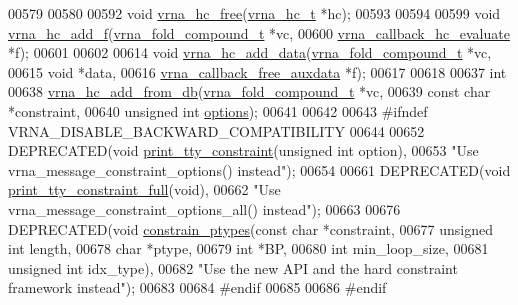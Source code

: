 \begin{DoxyCode}
00579 
00580 
00592 \textcolor{keywordtype}{void} \hyperlink{group__hard__constraints_ga696dcf77887d856c6f21ea266d8b9ca2}{vrna\_hc\_free}(\hyperlink{group__hard__constraints_structvrna__hc__s}{vrna\_hc\_t} *hc);
00593 
00594 
00599 \textcolor{keywordtype}{void} \hyperlink{constraints__hard_8h_af220427ba7ecc8e786a07b7799658f18}{vrna\_hc\_add\_f}(\hyperlink{group__fold__compound_structvrna__fc__s}{vrna\_fold\_compound\_t}       *vc,
00600                    \hyperlink{group__hard__constraints_gae465f1d4a3d8b6592b38ecbb0d9f613d}{vrna\_callback\_hc\_evaluate}  *f);
00601 
00602 
00614 \textcolor{keywordtype}{void} \hyperlink{constraints__hard_8h_a128920e0af52e4196a9d59fa13336c7c}{vrna\_hc\_add\_data}(\hyperlink{group__fold__compound_structvrna__fc__s}{vrna\_fold\_compound\_t}        *vc,
00615                       \textcolor{keywordtype}{void}                        *data,
00616                       \hyperlink{group__fold__compound_ga7806651f51b195013839a218b3bbd5a3}{vrna\_callback\_free\_auxdata}  *f);
00617 
00618 
00637 \textcolor{keywordtype}{int}
00638 \hyperlink{group__hard__constraints_ga5b4de3247b67358080c176b94591a8e6}{vrna\_hc\_add\_from\_db}(\hyperlink{group__fold__compound_structvrna__fc__s}{vrna\_fold\_compound\_t}  *vc,
00639                     \textcolor{keyword}{const} \textcolor{keywordtype}{char}            *constraint,
00640                     \textcolor{keywordtype}{unsigned} \textcolor{keywordtype}{int}          \hyperlink{group__hard__constraints_a468414760f373f7dc0eb1fd47cf708d0}{options});
00641 
00642 
00643 \textcolor{preprocessor}{#ifndef VRNA\_DISABLE\_BACKWARD\_COMPATIBILITY}
00644 
00652 DEPRECATED(\textcolor{keywordtype}{void} \hyperlink{constraints__hard_8h_a4d167deb70bb51723e44374dc981deb2}{print\_tty\_constraint}(\textcolor{keywordtype}{unsigned} \textcolor{keywordtype}{int} option),
00653           \textcolor{stringliteral}{"Use vrna\_message\_constraint\_options() instead"});
00654 
00661 DEPRECATED(\textcolor{keywordtype}{void} \hyperlink{constraints__hard_8h_ae8ae8a34962b9959be3f6c40f0a80ac1}{print\_tty\_constraint\_full}(\textcolor{keywordtype}{void}),
00662           \textcolor{stringliteral}{"Use vrna\_message\_constraint\_options\_all() instead"});
00663 
00676 DEPRECATED(\textcolor{keywordtype}{void} \hyperlink{constraints__hard_8h_a36c3a6c3218b041f992052767bc74549}{constrain\_ptypes}(\textcolor{keyword}{const} \textcolor{keywordtype}{char}   *constraint,
00677                                  \textcolor{keywordtype}{unsigned} \textcolor{keywordtype}{int} length,
00678                                  \textcolor{keywordtype}{char}         *ptype,
00679                                  \textcolor{keywordtype}{int}          *BP,
00680                                  \textcolor{keywordtype}{int}          min\_loop\_size,
00681                                  \textcolor{keywordtype}{unsigned} \textcolor{keywordtype}{int} idx\_type),
00682           \textcolor{stringliteral}{"Use the new API and the hard constraint framework instead"});
00683 
00684 \textcolor{preprocessor}{#endif}
00685 
00686 \textcolor{preprocessor}{#endif}
\end{DoxyCode}
